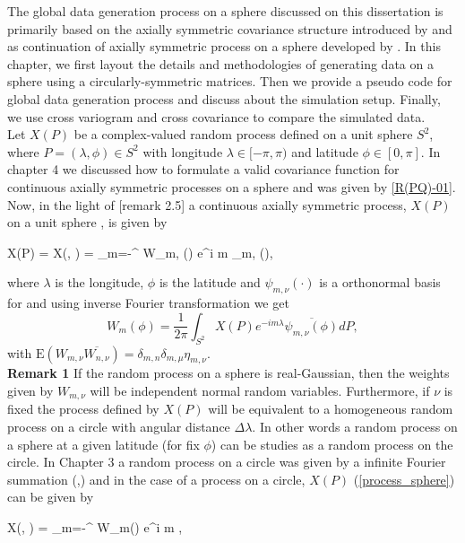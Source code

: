 The global data generation process on a sphere discussed on this dissertation is primarily based on the axially symmetric covariance structure introduced by \cite{Jones1963} and as continuation of axially symmetric process on a sphere developed by \cite{Huang2012}. In this chapter, we first layout the details and methodologies of generating data on a sphere using a circularly-symmetric matrices. Then we provide a pseudo code for global data generation process and discuss about the simulation setup. Finally, we use cross variogram and cross covariance to compare the simulated data.  \\

Let $X(P)$ be a complex-valued random process defined on a unit sphere $S^2$, where $P = (\lambda, \phi) \in S^2$ with longitude $\lambda \in [-\pi, \pi)$ and latitude $\phi \in [0, \pi]$. In chapter 4 we discussed how to formulate a valid covariance function for continuous axially symmetric processes on a sphere and was given by \ref{R(PQ)-01}. Now, in the light of \cite{Huang2012}[remark 2.5] a continuous axially symmetric process, $X(P)$ on a unit sphere , is given by
			
	\beq \label{process_sphere}
	X(P) = X(\phi, \lambda) = \sum_{m=-\infty}^{\infty} W_{m, \nu}(\phi) e^{i m \lambda}\psi_{m,\nu} (\phi),
	\eeq
			
	where $\lambda$ is the longitude, $\phi$ is the latitude and $\psi_{m,\nu}(\cdot)$ is a orthonormal basis for \Cm and using inverse Fourier transformation we get
	\[
		W_m(\phi) = \frac{1}{2\pi} \int_{S^2} X(P) e^{-im\lambda} \overline{\psi_{m,\nu} (\phi)} dP,
	\]
	with $\mbox{E}(W_{m, \nu} \overline{W_{n,\nu}}) = \delta_{m,n}\delta_{m,\mu}\eta_{m,\nu}$. \\
			
	{\bf Remark 1} If the random process on a sphere is real-Gaussian, then the weights given by $W_{m,\nu}$ will be independent normal random variables. Furthermore, if $\nu$ is fixed the process defined by $X(P)$ will be equivalent to a homogeneous random process on a circle with angular distance $\Delta \lambda$. In other words a random process on a sphere at a given latitude (for fix $\phi$) can be studies as a random process on the circle. In Chapter 3 \label{process_circle} a random process on a circle was given by a infinite Fourier summation (\cite{Roy1972},\cite{DUFOUR1976107}) and in the case of a process on a circle, $X(P)$ (\ref{process_sphere}) can be given by   
			
	\beq \label{eq:sym_process} 
	X(\phi, \lambda) = \sum_{m=-\infty}^{\infty} W_m(\phi) e^{i m \lambda},
	\eeq
			
